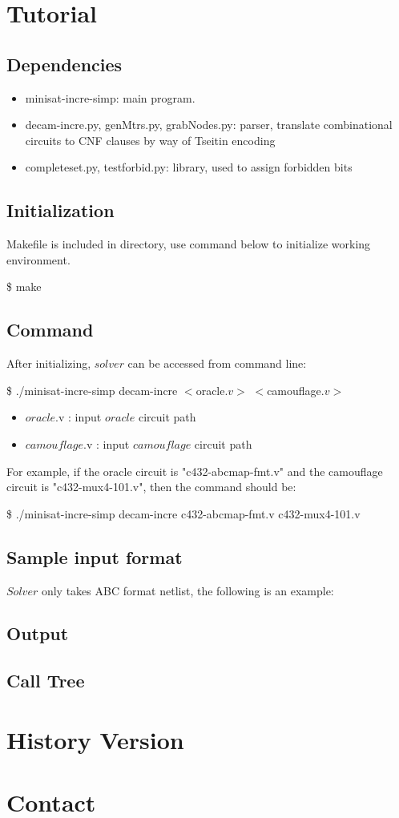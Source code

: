 \documentclass{article}
\begin{document}
\section{Tutorial}
	\subsection{Dependencies}
		\begin{itemize}
			\item minisat-incre-simp: main program.
			\item decam-incre.py, genMtrs.py, grabNodes.py: parser, translate combinational circuits to CNF clauses by way of Tseitin encoding
			\item completeset.py, testforbid.py: library, used to assign forbidden bits
		\end{itemize}
	\subsection{Initialization}
		Makefile is included in directory, use command below to initialize working environment.
		\newline 
		\centerline{\$ make}
	\subsection{Command}
		After initializing, $solver$ can be accessed from command line:
		\newline
		\centerline{ \$ ./minisat-incre-simp decam-incre $<$oracle$.v>$ $<$camouflage$.v>$}
			\begin{itemize}
				\item $oracle$.v : input $oracle$ circuit path 
				\item $camouflage$.v : input $camouflage$ circuit path
			\end{itemize}
		For example, if the oracle circuit is "c432-abcmap-fmt.v" and the camouflage circuit is "c432-mux4-101.v", then the command should be:
		\newline
		\centerline{\$ ./minisat-incre-simp decam-incre c432-abcmap-fmt.v c432-mux4-101.v}
	\subsection{Sample input format}
	$Solver$ only takes ABC format netlist, the following is an example: 
	\subsection{Output}
	\subsection{Call Tree}
\section{History Version}
\section{Contact}	
\end{document}
